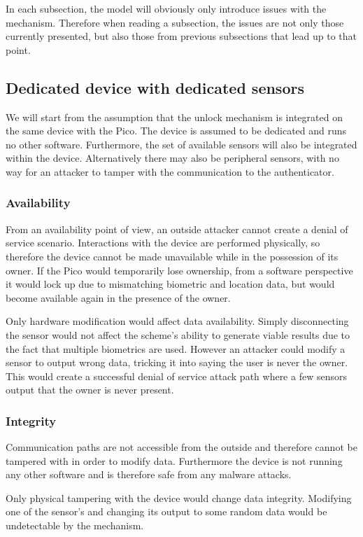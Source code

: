 In each subsection, the model will obviously only introduce issues with the mechanism. Therefore when reading a subsection, the issues are not only those currently presented, but also those from previous subsections that lead up to that point.

\subsection{Dedicated device with dedicated sensors}
We will start from the assumption that the unlock mechanism is integrated on the same device with the Pico. The device is assumed to be dedicated and runs no other software. Furthermore, the set of available sensors will also be integrated within the device. Alternatively there may also be peripheral sensors, with no way for an attacker to tamper with the communication to the authenticator. 

	\subsubsection*{Availability}
	From an availability point of view, an outside attacker cannot create a denial of service scenario. Interactions with the device are performed physically, so therefore the device cannot be made unavailable while in the possession of its owner. If the Pico would temporarily lose ownership, from a software perspective it would lock up due to mismatching biometric and location data, but would become available again in the presence of the owner. 
	
	Only hardware modification would affect data availability. Simply disconnecting the sensor would not affect the scheme's ability to generate viable results due to the fact that multiple biometrics are used. However an attacker could modify a sensor to output wrong data, tricking it into saying the user is never the owner. This would create a successful denial of service attack path where a few sensors output that the owner is never present. 
	
	\subsubsection*{Integrity}
	Communication paths are not accessible from the outside and therefore cannot be tampered with in order to modify data. Furthermore the device is not running any other software and is therefore safe from any malware attacks. 
	
	Only physical tampering with the device would change data integrity. Modifying one of the sensor's and changing its output to some random data would be undetectable by the mechanism. 
	
